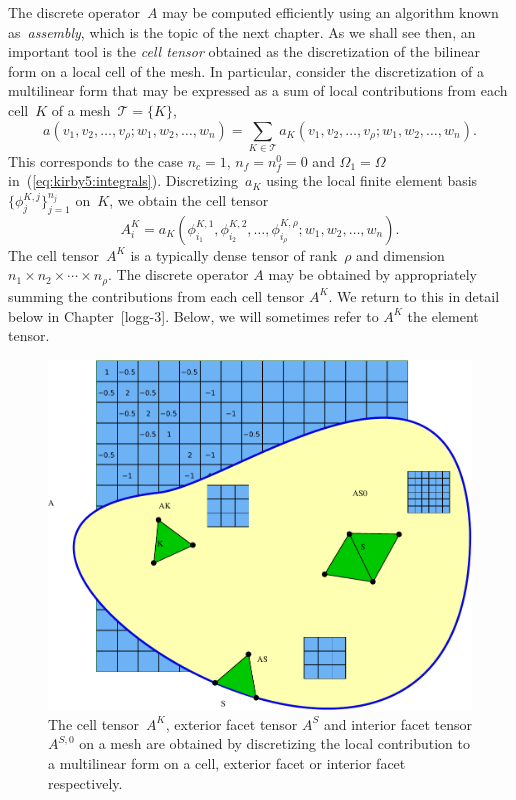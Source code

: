 The discrete operator~$A$ may be computed efficiently using an
algorithm known as~\emph{assembly}, which is the topic of the next
chapter. As we shall see then, an important tool is the \emph{cell
  tensor} obtained as the discretization of the bilinear form on a
local cell of the mesh. In particular, consider the discretization of
a multilinear form that may be expressed as a sum of local
contributions from each cell~$K$ of a mesh~$\mathcal{T} = \{K\}$,
\begin{displaymath}
  a(v_1, v_2, \ldots, v_{\rho}; w_1, w_2, \ldots, w_n)
  = \sum_{K\in\mathcal{T}} a_K(v_1, v_2, \ldots, v_{\rho}; w_1, w_2, \ldots, w_n).
\end{displaymath}
This corresponds to the case $n_c = 1$, $n_f = n_f^0 = 0$ and $\Omega_1
= \Omega$ in~(\ref{eq:kirby5:integrals}). Discretizing~$a_K$ using the
local finite element basis~$\{\phi^{K,j}_j\}_{j=1}^{n_j}$ on~$K$, we
obtain the cell tensor
\begin{equation} \label{eq:kirby5:celltensor}
  A^K_i
  = a_K(\phi^{K,1}_{i_1}, \phi^{K,2}_{i_2}, \ldots, \phi^{K,\rho}_{i_{\rho}}; w_1, w_2, \ldots, w_n).
\end{equation}
The cell tensor~$A^K$ is a typically dense tensor of rank~$\rho$ and
dimension $n_1 \times n_2 \times \cdots \times n_{\rho}$. The discrete
operator $A$ may be obtained by appropriately summing the
contributions from each cell tensor $A^K$. We return to this in detail
below in Chapter~[logg-3]. Below, we will sometimes refer to $A^K$ the
element tensor.

\begin{figure}
  \begin{center}
    \includegraphics[width=\largefig]{chapters/kirby-5/pdf/element_tensors.pdf}
    \caption{The cell tensor~$A^K$, exterior facet tensor $A^S$ and
      interior facet tensor $A^{S,0}$ on a mesh are obtained by
      discretizing the local contribution to a multilinear form on a
      cell, exterior facet or interior facet
      respectively.}
    \label{fig:kirby5:tensors}
  \end{center}
\end{figure}

